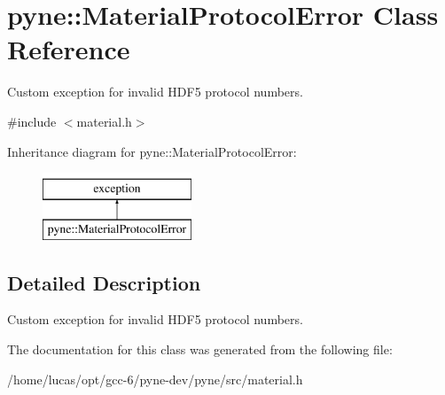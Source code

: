 \hypertarget{classpyne_1_1_material_protocol_error}{}\section{pyne\+:\+:Material\+Protocol\+Error Class Reference}
\label{classpyne_1_1_material_protocol_error}


Custom exception for invalid H\+D\+F5 protocol numbers.  




{\ttfamily \#include $<$material.\+h$>$}

Inheritance diagram for pyne\+:\+:Material\+Protocol\+Error\+:\begin{figure}[H]
\begin{center}
\leavevmode
\includegraphics[height=2.000000cm]{classpyne_1_1_material_protocol_error}
\end{center}
\end{figure}


\subsection{Detailed Description}
Custom exception for invalid H\+D\+F5 protocol numbers. 

The documentation for this class was generated from the following file\+:\begin{DoxyCompactItemize}
\item 
/home/lucas/opt/gcc-\/6/pyne-\/dev/pyne/src/material.\+h\end{DoxyCompactItemize}
